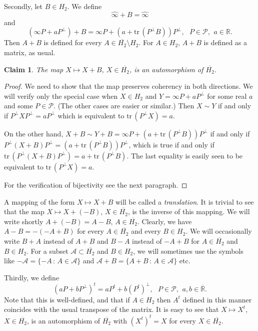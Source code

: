 \documentclass[10pt,a4paper]{amsart}
\providecommand{\index}[1]{}
\newcommand\oH{{\overline{H_2}}}
\newcommand\oi{{\widehat{\infty}}}
\newcommand\oR{{\overline{\mathbb{R}}}}
\newtheorem{claim}[theorem]{Claim}
\theoremstyle{definition}
\theoremstyle{remark}
\numberwithin{subsection}{section}
\numberwithin{equation}{section}
\begin{document}
Secondly, let $B \in H_2$. We define
\[
{\oi} +B = {\oi}
\]
and
\[
( \infty P + aP^{\perp}) + B =  \infty P + ( a + \mathrm{tr}\, (P^\perp B) )P^{\perp}  , \ \ \ P\in \mathcal{P}, \ \, a \in \mathbb{R}.
\]
Then $A+B$ \index{$A+B$} is defined for every $A\in \oH\setminus H_2$.
For $A\in H_2$, $A+B$ is defined as a matrix, as usual.
\begin{claim}
The map $X \mapsto X + B$, $X \in \oH$, is an automorphism of $\oH$. 
\end{claim}
\begin{proof}
We need to show that the map preserves coherency in both directions. We will verify only the special case when $X \in H_2$ and $Y =  \infty P + aP^{\perp}$ for some real $a$ and some $P \in \mathcal{P}$. (The other cases are easier or similar.) Then $X \sim Y$ if and only if $P ^\perp X P ^\perp = a P ^\perp$ which is equivalent to $\mathrm{tr}\, (P ^\perp X) = a$.

On the other hand, $ X + B \sim Y+ B = \infty P + (a + \mathrm{tr}\,( P^{\perp} B)) P^\perp$ if and only if $P ^\perp (X+B) P ^\perp = (a + \mathrm{tr}\, (P^{\perp} B)) P^\perp$, which is true if and only if $\mathrm{tr}\, ( P ^\perp (X+B) P ^\perp ) = a + \mathrm{tr}\, (P^{\perp} B)$. The last equality is easily seen to be equivalent to $\mathrm{tr}\, (P ^\perp X) = a$.

For the verification of bijectivity see the next paragraph.
\end{proof}

A mapping of the form $X\mapsto X+B$ will be called a \emph{translation}. \index{translation}
It is trivial to see that the map $X \mapsto X + (- B)$, $X \in \oH$, is the inverse of this mapping. 
We will write shortly $A + (-B) = A-B$\index{$A-B$}, $A \in \oH$. Clearly, we have $A-B = - (-A + B)$ for every $A \in \oH$ and every $B \in H_2$.
We will occasionally write $B+A$ instead of $A+ B$ and $B-A$ instead of $-A+ B$ for $A \in \oH$ and $B \in H_2$. For a subset $\mathcal{A}\subset \oH$ and $B\in H_2$, we will sometimes use the symbols like $-\mathcal{A}=\{-A\,:\, A\in \mathcal{A}\}$ and $\mathcal{A}+B=\{A+B\,:\, A\in \mathcal{A}\}$ etc.
 
Thirdly, we define
\[
( a P + bP^{\perp})^t =  a P^t +  b (P^t)^{\perp}  , \ \ \ P\in \mathcal{P}, \ \,a,b\in \oR. \index{$A^t$}
\]
Note that this is well-defined, and that if $A\in H_2$ then $A^t$ defined in this manner coincides with the usual transpose of the matrix.
It is easy to see that $X \mapsto X^t$, $X \in \oH$, is an automorphism of $\oH$ with $(X^t)^t = X$ for every $X \in \oH$.
\end{document}
